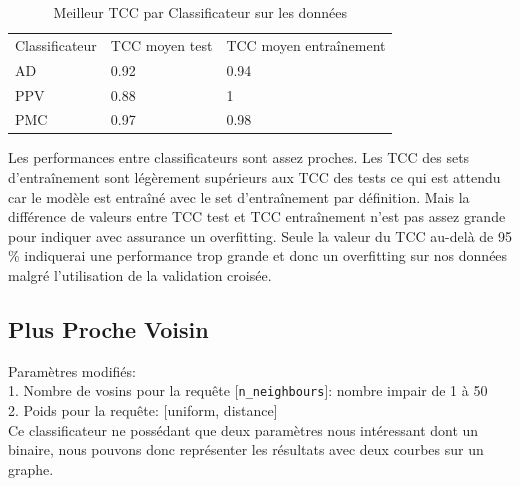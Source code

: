 \documentclass[10pt,letterpaper]{article}
\newlength\savedwidth
\newcommand\thickhline{\noalign{\global\savedwidth\arrayrulewidth\global\arrayrulewidth 2pt}%
\hline
\noalign{\global\arrayrulewidth\savedwidth}}
\begin{document}
\begin{table}[h]
  \centering
  \caption{Meilleur TCC par Classificateur sur les données  \protect{}}
\begin{tabular}{lll}
\hline
Classificateur & TCC moyen test 
 & TCC moyen entraînement
\\ \thickhline
AD & \hspace{5mm}0.92 & \hspace{20mm}0.94
 \\ \hline
PPV & \hspace{5mm}0.88 & \hspace{20mm}1 \\ \hline
PMC & \hspace{5mm}0.97 & \hspace{20mm}0.98\\ \hline
\end{tabular}
\end{table}
Les performances entre classificateurs sont assez proches. 
Les TCC des sets d’entraînement sont légèrement supérieurs aux TCC des tests ce qui est attendu car le modèle est entraîné avec le set d’entraînement par définition. Mais la différence de valeurs entre TCC test et TCC entraînement n’est pas assez grande pour indiquer avec assurance un overfitting. 
Seule la valeur du TCC au-delà de 95 \% indiquerai une performance trop grande et donc un overfitting sur nos données malgré l’utilisation de la validation croisée.

\subsection*{Plus Proche Voisin}
Paramètres modifiés:\\
1. Nombre de vosins pour la requête [\verb!n_neighbours!]: nombre impair de 1 à 50\\
2. Poids pour la requête: [uniform, distance]\\
\vspace{1mm}
Ce classificateur ne possédant que deux paramètres nous intéressant dont un binaire, nous pouvons donc représenter les résultats avec deux courbes sur un graphe.
\end{document}
